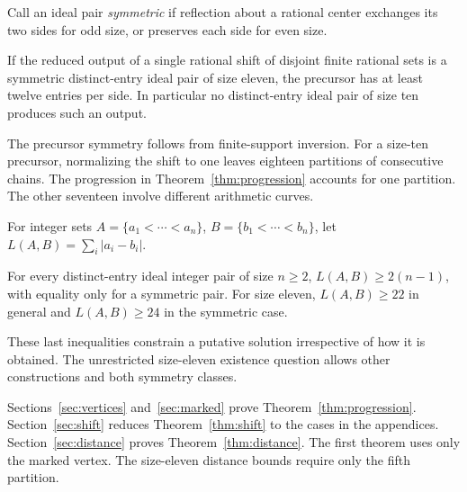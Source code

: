 Call an ideal pair \emph{symmetric} if reflection about a rational center exchanges its two sides for odd size, or preserves each side for even size.
\begin{theorem}\label{thm:shift}
If the reduced output of a single rational shift of disjoint finite rational sets is a symmetric distinct-entry ideal pair of size eleven, the precursor has at least twelve entries per side. In particular no distinct-entry ideal pair of size ten produces such an output.
\end{theorem}
The precursor symmetry follows from finite-support inversion. For a size-ten precursor, normalizing the shift to one leaves eighteen partitions of consecutive chains. The progression in Theorem~\ref{thm:progression} accounts for one partition. The other seventeen involve different arithmetic curves.

For integer sets \(A=\{a_1<\cdots<a_n\}\), \(B=\{b_1<\cdots<b_n\}\), let \(L(A,B)=\sum_i|a_i-b_i|\).
\begin{theorem}[Distance]\label{thm:distance}
For every distinct-entry ideal integer pair of size \(n\ge2\), \(L(A,B)\ge2(n-1)\), with equality only for a symmetric pair. For size eleven, \(L(A,B)\ge22\) in general and \(L(A,B)\ge24\) in the symmetric case.
\end{theorem}
These last inequalities constrain a putative solution irrespective of how it is obtained. The unrestricted size-eleven existence question allows other constructions and both symmetry classes.

Sections~\ref{sec:vertices} and~\ref{sec:marked} prove Theorem~\ref{thm:progression}. Section~\ref{sec:shift} reduces Theorem~\ref{thm:shift} to the cases in the appendices. Section~\ref{sec:distance} proves Theorem~\ref{thm:distance}. The first theorem uses only the marked vertex. The size-eleven distance bounds require only the fifth partition.
